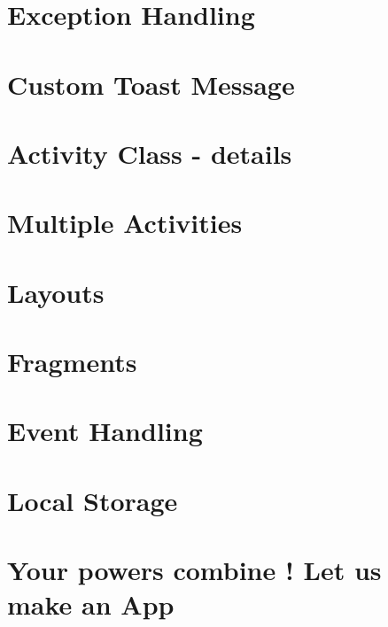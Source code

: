 \documentclass[11pt]{beamer}
\begin{document}
\section{Exception Handling}


\section{Custom Toast Message}

\section{Activity Class - details}

\section{Multiple Activities}

\section{Layouts}






\section{Fragments}
%

\section{Event Handling}
%

\section{Local Storage}
%


\section{Your powers combine ! Let us make an App}
\end{document}
